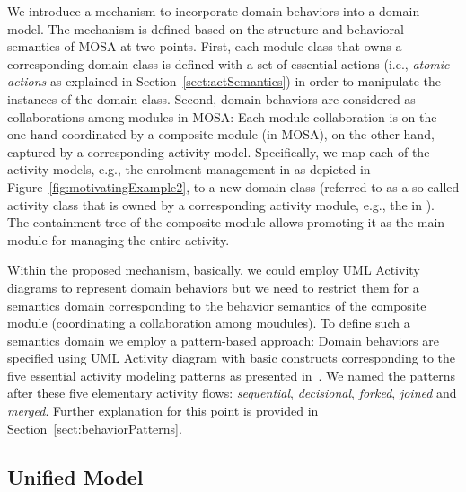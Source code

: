 We introduce a mechanism to incorporate domain behaviors into a domain model. The mechanism is defined based on the structure and behavioral semantics of MOSA at two points. %
%
First, each module class that owns a corresponding domain class  is defined with a set of essential actions (i.e., \textit{atomic actions} as explained in Section~\ref{sect:actSemantics}) in order to manipulate the instances of the domain class. %
%
Second, domain behaviors are considered as collaborations among modules in MOSA: Each module collaboration is on the one hand coordinated by a composite module (in MOSA), on the other hand, captured by a corresponding activity model. Specifically, we map each of the activity models, e.g., the enrolment management in \courseman as depicted in Figure~\ref{fig:motivatingExample2}, to a new domain class (referred to as a so-called activity class that is owned by a corresponding activity module, e.g., the  in \courseman). The containment tree of the composite module allows promoting it as the main module for managing the entire activity.

Within the proposed mechanism, basically, we could employ UML Activity diagrams to represent domain behaviors but we need to restrict them for a semantics domain corresponding to the behavior semantics of the composite module (coordinating a collaboration among moudules). To define such a semantics domain we employ a pattern-based approach: Domain behaviors are specified using UML Activity diagram with basic constructs corresponding to the five essential activity modeling patterns as presented in~\cite{le_domain_2018}. We named the patterns after these five elementary activity flows: \textit{sequential}, \textit{decisional}, \textit{forked}, \textit{joined} and \textit{merged}. Further explanation for this point is provided in Section~\ref{sect:behaviorPatterns}.

\subsection{Unified Model}
\label{subsect:unifiedModel}

